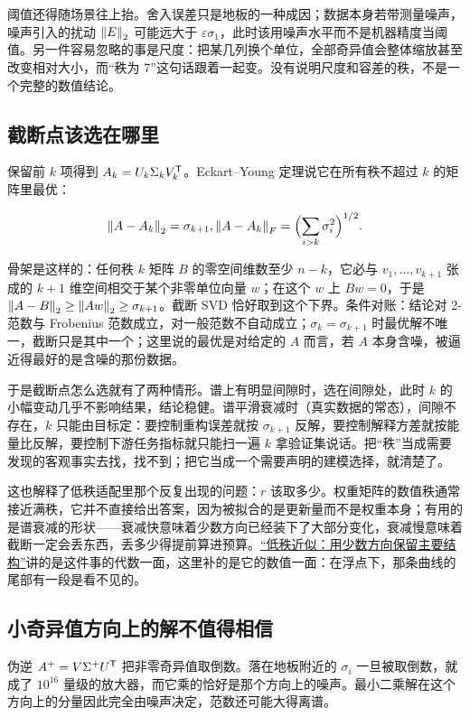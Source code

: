 阈值还得随场景往上抬。舍入误差只是地板的一种成因；数据本身若带测量噪声，噪声引入的扰动 \(\left\lVert E\right\rVert_2\) 可能远大于 \(\varepsilon\sigma_1\)，此时该用噪声水平而不是机器精度当阈值。另一件容易忽略的事是尺度：把某几列换个单位，全部奇异值会整体缩放甚至改变相对大小，而``秩为 7''这句话跟着一起变。没有说明尺度和容差的秩，不是一个完整的数值结论。

\subsection{截断点该选在哪里}

保留前 \(k\) 项得到 \(A_k=U_k\Sigma_kV_k^{\mathsf{T}}\)。Eckart--Young 定理说它在所有秩不超过 \(k\) 的矩阵里最优：

\[
\left\lVert A-A_k\right\rVert_2=\sigma_{k+1},
\space
\left\lVert A-A_k\right\rVert_F=\Bigl(\sum_{i>k}\sigma_i^2\Bigr)^{1/2}.
\]

骨架是这样的：任何秩 \(k\) 矩阵 \(B\) 的零空间维数至少 \(n-k\)，它必与 \(v_1,\ldots,v_{k+1}\) 张成的 \(k+1\) 维空间相交于某个非零单位向量 \(w\)；在这个 \(w\) 上 \(Bw=0\)，于是 \(\left\lVert A-B\right\rVert_2\ge\left\lVert Aw\right\rVert_2\ge\sigma_{k+1}\)。截断 SVD 恰好取到这个下界。条件对账：结论对 2-范数与 Frobenius 范数成立，对一般范数不自动成立；\(\sigma_k=\sigma_{k+1}\) 时最优解不唯一，截断只是其中一个；这里说的最优是对给定的 \(A\) 而言，若 \(A\) 本身含噪，被逼近得最好的是含噪的那份数据。

于是截断点怎么选就有了两种情形。谱上有明显间隙时，选在间隙处，此时 \(k\) 的小幅变动几乎不影响结果，结论稳健。谱平滑衰减时（真实数据的常态），间隙不存在，\(k\) 只能由目标定：要控制重构误差就按 \(\sigma_{k+1}\) 反解，要控制解释方差就按能量比反解，要控制下游任务指标就只能扫一遍 \(k\) 拿验证集说话。把``秩''当成需要发现的客观事实去找，找不到；把它当成一个需要声明的建模选择，就清楚了。

这也解释了低秩适配里那个反复出现的问题：\(r\) 该取多少。权重矩阵的数值秩通常接近满秩，它并不直接给出答案，因为被拟合的是更新量而不是权重本身；有用的是谱衰减的形状——衰减快意味着少数方向已经装下了大部分变化，衰减慢意味着截断一定会丢东西，丢多少得提前算进预算。\hyperref[sec:03-Linear-Algebra/07-SVD-and-Data-Applications/03]{``低秩近似：用少数方向保留主要结构''}讲的是这件事的代数一面，这里补的是它的数值一面：在浮点下，那条曲线的尾部有一段是看不见的。

\subsection{小奇异值方向上的解不值得相信}

伪逆 \(A^+=V\Sigma^+U^{\mathsf{T}}\) 把非零奇异值取倒数。落在地板附近的 \(\sigma_i\) 一旦被取倒数，就成了 \(10^{16}\) 量级的放大器，而它乘的恰好是那个方向上的噪声。最小二乘解在这个方向上的分量因此完全由噪声决定，范数还可能大得离谱。

